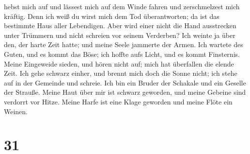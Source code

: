 hebst mich auf und lässest mich auf dem Winde fahren und zerschmelzest
mich kräftig.  Denn ich weiß du wirst mich dem Tod
überantworten; da ist das bestimmte Haus aller Lebendigen.
 Aber wird einer nicht die Hand ausstrecken unter
Trümmern und nicht schreien vor seinem Verderben?  Ich
weinte ja über den, der harte Zeit hatte; und meine Seele jammerte der
Armen.  Ich wartete des Guten, und es kommt das Böse; ich
hoffte aufs Licht, und es kommt Finsternis.  Meine
Eingeweide sieden, und hören nicht auf; mich hat überfallen die elende
Zeit.  Ich gehe schwarz einher, und brennt mich doch die
Sonne nicht; ich stehe auf in der Gemeinde und schreie. 
Ich bin ein Bruder der Schakale und ein Geselle der Strauße.
 Meine Haut über mir ist schwarz geworden, und meine
Gebeine sind verdorrt vor Hitze.  Meine Harfe ist eine
Klage geworden und meine Flöte ein Weinen.

\hypertarget{section-30}{%
\section{31}\label{section-30}}

